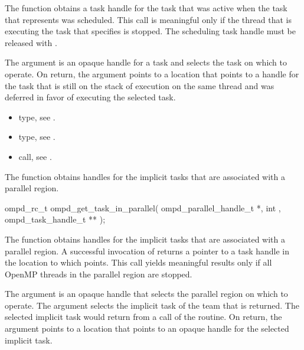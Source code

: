 \descr
The  function obtains a task handle 
for the task that was active when the task that  represents
was scheduled. This call is meaningful only if the thread that is executing 
the task that  specifies is stopped. The scheduling task 
handle must be released with .

\argdesc
The  argument is an opaque handle for a task and selects 
the task on which to operate. On return, the  
argument points to a location that points to a handle for the task that is
still on the stack of execution on the same thread and was deferred in favor 
of executing the selected task.

\crossreferences
\begin{itemize}
\item {} type, see .

\item {} type, see .

\item {} call, see 
.
\end{itemize}



\label{subsubsubsec:ompd_get_task_in_parallel}
\summary
The   function obtains handles for
the implicit tasks that are associated with a parallel region.

\format
\begin{cspecific}
\begin{ompSyntax}
ompd_rc_t ompd_get_task_in_parallel(
  ompd_parallel_handle_t *,
  int ,
  ompd_task_handle_t **
);
\end{ompSyntax}
\end{cspecific}

\descr
The  function obtains handles for
the implicit tasks that are associated with a parallel region. A 
successful invocation of   returns 
a pointer to a task handle in the location to which 
points. This call yields meaningful results only if all OpenMP threads 
in the parallel region are stopped.

\argdesc
The  argument is an opaque handle that selects the 
parallel region on which to operate. The  argument selects 
the implicit task of the team that is returned. The selected implicit task 
would return  from a call of the  
routine. On return, the  argument points to a location 
that points to an opaque handle for the selected implicit task.


